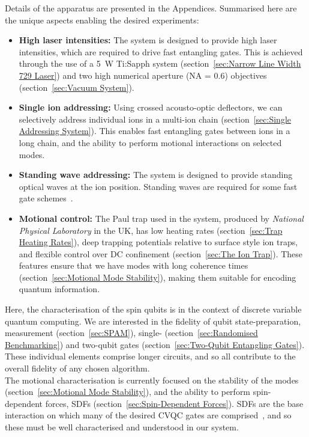     Details of the apparatus are presented in the Appendices. Summarised here are the unique aspects enabling the desired experiments:
    \begin{itemize}
    \item \textbf{High laser intensities:} The system is designed to provide
        high laser intensities, which are required to drive fast entangling
        gates. This is achieved through the use of a 5~W Ti:Sapph system (section~\ref{sec:Narrow Line Width 729 Laser}) and
        two high numerical aperture (NA = 0.6) objectives (section~\ref{sec:Vacuum System}).
    \item \textbf{Single ion addressing:} Using crossed acousto-optic
        deflectors, we can selectively address individual ions in a multi-ion chain (section~\ref{sec:Single Addressing System}).
        This enables fast entangling gates between ions in a long
        chain, and the ability to perform motional interactions on selected modes.
    \item \textbf{Standing wave addressing:} The system is designed to provide
        standing optical waves at the ion position. Standing waves are required for
        some fast gate schemes~\cite{saner_breaking_2023}. 
    \item \textbf{Motional control:} The Paul trap used in the system, produced
        by \emph{National Physical Laboratory} in the UK, has low heating rates (section~\ref{sec:Trap Heating Rates}),
        deep trapping potentials relative to surface style ion traps, and flexible
        control over DC confinement (section~\ref{sec:The Ion Trap}). These features ensure that we have modes
        with long coherence times (section~\ref{sec:Motional Mode Stability}), making them suitable for encoding quantum
        information.
    \end{itemize}

    Here, the characterisation of the spin qubits is in the context of discrete
    variable quantum computing. We are interested in the fidelity of qubit
    state-preparation, measurement (section~\ref{sec:SPAM}), single- (section~\ref{sec:Randomised Benchmarking}) and two-qubit gates (section~\ref{sec:Two-Qubit Entangling Gates}). These
    individual elements comprise longer circuits, and so all contribute to the
    overall fidelity of any chosen algorithm.\\
    The motional characterisation is currently focused on the stability of the
    modes (section~\ref{sec:Motional Mode Stability}), and the ability to perform spin-dependent forces, SDFs (section~\ref{sec:Spin-Dependent Forces}). SDFs are the
    base interaction on which many of the desired CVQC gates are
    comprised~\cite{sutherland_universal_2021}, and so these must be well
    characterised and understood in our system.\\

